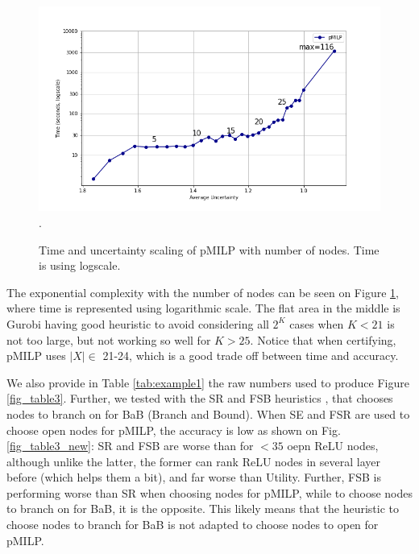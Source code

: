 {\begin{figure}[b!]
	\hspace*{-0.8cm}
	\includegraphics[scale=0.6]{Layer3_comparison}.
	\caption{Time and uncertainty scaling of pMILP with number of nodes.
	Time is using logscale.}
	\label{fig3}
\end{figure}


The exponential complexity with the number of nodes can be seen on Figure \ref{fig3}, where time is represented using logarithmic scale. The flat area in the middle is Gurobi having good heuristic to avoid considering all $2^K$ cases when $K<21$ is not too large, but not working so well for $K>25$. Notice that when certifying, pMILP uses $|X| \in$ 21-24, which is a good trade off between time and accuracy.


We also provide in Table \ref{tab:example1} the raw numbers used to produce Figure \ref{fig_table3}.
Further, we tested with the SR and FSB heuristics \cite{BaB}, that chooses nodes to branch on for BaB (Branch and Bound). When SE and FSR are used to choose open nodes for pMILP, the accuracy is low as shown on Fig. \ref{fig_table3_new}: SR and FSB are worse than \cite{DivideAndSlide} for $<35$ oepn ReLU nodes, although unlike the latter, the former can rank ReLU nodes in several layer before (which helps them a bit), and far worse than Utility. Further, FSB is performing worse than SR when choosing nodes for pMILP, while to choose nodes to branch on for BaB, it is the opposite. This likely means that the heuristic to choose nodes to branch for BaB is not adapted to choose nodes to open for pMILP.

}
